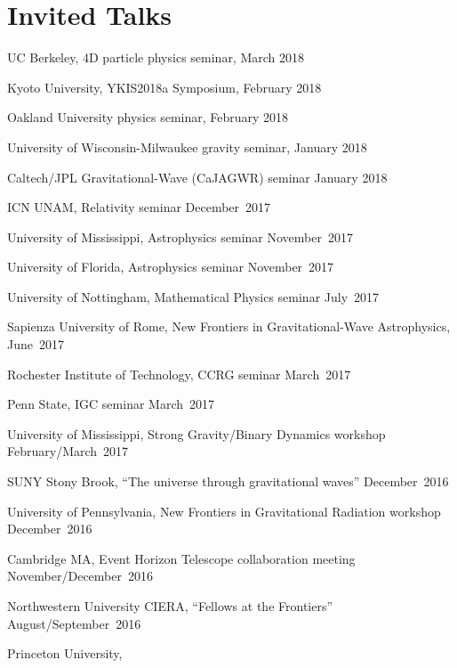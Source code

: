 \newcommand{\playsymbol}{$\blacktriangleright$}
\section{\sc Invited Talks}
\begin{etaremune}
\item
  UC Berkeley, 4D particle physics seminar,
  \hfill{}
  March 2018
\item
  Kyoto University, YKIS2018a Symposium,
  \hfill{}
  February 2018
\item
  Oakland University physics seminar,
  \hfill{}
  February 2018
\item
  University of Wisconsin-Milwaukee gravity seminar,
  \hfill{}
  January 2018
\item
  Caltech/JPL Gravitational-Wave (CaJAGWR) seminar
  \hfill{}
  January 2018
\item
  ICN UNAM,
  Relativity seminar
  \hfill{}
  December~2017
\item
  University of Mississippi,
  Astrophysics seminar
  \hfill{}
  November~2017
\item
  University of Florida,
  Astrophysics seminar
  \hfill{}
  November~2017
\item
  University of Nottingham,
  Mathematical Physics seminar
  \hfill{}
  July~2017
\item
  Sapienza University of Rome,
  New Frontiers in Gravitational-Wave Astrophysics,
  \hfill{}
  June~2017
\item
  Rochester Institute of Technology,
  CCRG seminar
  \hfill{}
  March~2017
\item
  Penn State,
  IGC seminar
  \hfill{}
  March~2017
\item
  University of Mississippi,
  Strong Gravity/Binary Dynamics workshop
  \hfill{}
  February/March~2017
\item
  SUNY Stony Brook,
  ``The universe through gravitational waves''
  \hfill{}
  December~2016
\item
  University of Pennsylvania,
  New Frontiers in Gravitational Radiation workshop
  \hfill{}
  December~2016
\item
  Cambridge MA,
  Event Horizon Telescope collaboration meeting
  \hfill{}
  November/December~2016
\item
  Northwestern University CIERA,
  ``Fellows at the Frontiers''
  \hfill{}
  August/September~2016
\item
  Princeton University,

\end{etaremune}
